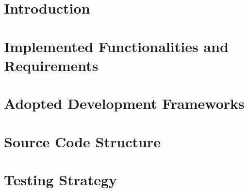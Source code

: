 \documentclass [11pt,twoside]{article}
\begin{document}
  
    
    \setcounter{page}{2}
    \newpage
    \tableofcontents
    \newpage
    \listoffigures
    \newpage

    \listoftables
    \clearpage
    \section{Introduction}
    \label{sect:introduction}
    
    \clearpage
    \section{Implemented Functionalities and Requirements}
    \label{sect:architecturaldesign}
     
    \clearpage
    \section{Adopted Development Frameworks}
    \label{sect:UIdesign}
    
    \clearpage
    \section{Source Code Structure}
    \label{sect:req_traceability}
    
    \clearpage
    \section{Testing Strategy}
    \label{sect:testingstrategy}
    
    
\end{document}
